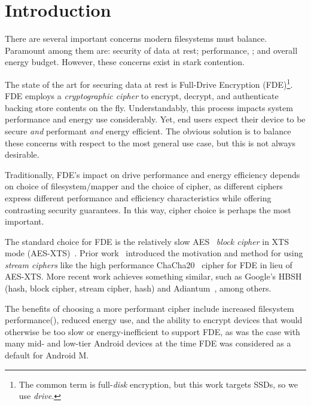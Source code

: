 \section{Introduction}\label{sec:introduction}

There are several important concerns modern filesystems must balance. Paramount
among them are: security of data at rest; performance, ; and overall energy budget. However, these concerns exist in
stark contention.

The state of the art for securing data at rest is Full-Drive Encryption
(FDE)\footnote{The common term is full-\emph{disk} encryption, but this work
targets SSDs, so we use \emph{drive}.}. FDE employs a \emph{cryptographic
cipher} to encrypt, decrypt, and authenticate backing store contents on the fly.
Understandably, this process impacts system performance and energy use
considerably. Yet, end users expect their device to be secure \emph{and}
performant \emph{and} energy efficient. The obvious solution is to balance these
concerns with respect to the most general use case, but this is not always
desirable. 

Traditionally, FDE's impact on drive performance and energy efficiency depends
on choice of filesystem/mapper and the choice of cipher, as different ciphers
express different performance and efficiency characteristics while offering
contrasting security guarantees. In this way, cipher choice is perhaps the most
important.

The standard choice for FDE is the relatively slow AES~\cite{AES} \emph{block
cipher} in XTS mode (AES-XTS)~\cite{AES-XTS}. Prior work~\cite{StrongBox}
introduced the motivation and method for using \emph{stream ciphers} like the
high performance ChaCha20~\cite{ChaCha20} cipher for FDE in lieu of AES-XTS.
More recent work achieves something similar, such as Google's HBSH~\cite{HBSH}
(hash, block cipher, stream cipher, hash) and Adiantum~\cite{Adiantum}, among
others.

The benefits of choosing a more performant cipher include increased filesystem
performance(), reduced energy use, and the
ability to encrypt devices that would otherwise be too slow or
energy-inefficient to support FDE, as was the case with many mid- and low-tier
Android devices at the time FDE was considered as a default for Android M.


